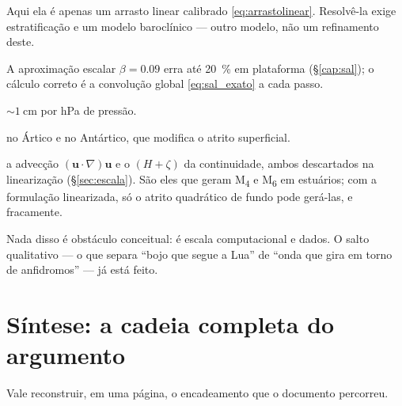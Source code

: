 \documentclass[11pt,a4paper,oneside]{report}
\theoremstyle{definition}
\theoremstyle{plain}
\theoremstyle{remark}
\newcommand{\vect}[1]{\bm{#1}}
\begin{document}
\begin{description}[style=nextline,leftmargin=0.8cm]
\item[Maré interna resolvida] Aqui ela é apenas um arrasto linear calibrado
  \eqref{eq:arrastolinear}. Resolvê-la exige estratificação e um modelo
  baroclínico — outro modelo, não um refinamento deste.
\item[SAL completo] A aproximação escalar $\beta=\num{0.09}$ erra até
  \SI{20}{\percent} em plataforma (\S\ref{cap:sal}); o cálculo correto é a
  convolução global \eqref{eq:sal_exato} a cada passo.
\item[Maré atmosférica e barômetro invertido] $\sim\SI{1}{\centi\meter}$ por
  hPa de pressão.
\item[Gelo marinho] no Ártico e no Antártico, que modifica o atrito superficial.
\item[Termos não-lineares] a advecção $(\vect{u}\cdot\nabla)\vect{u}$ e o
  $(H+\zeta)$ da continuidade, ambos descartados na linearização
  (\S\ref{sec:escala}). São eles que geram M\textsubscript{4} e
  M\textsubscript{6} em estuários; com a formulação linearizada, só o atrito
  quadrático de fundo pode gerá-las, e fracamente.
\end{description}

Nada disso é obstáculo conceitual: é escala computacional e dados. O salto
qualitativo — o que separa ``bojo que segue a Lua'' de ``onda que gira em torno
de anfidromos'' — já está feito.

\section{Síntese: a cadeia completa do argumento}

Vale reconstruir, em uma página, o encadeamento que o documento percorreu.
\end{document}
